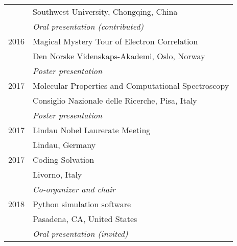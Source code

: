 \documentclass[notitlepage,a4paper,11pt]{article}
\begin{document}
\begin{itemize}
\begin{tabular}{ll}
         & Southwest University, Chongqing, China \\
         & \emph{Oral presentation (contributed)} \\
    2016 & Magical Mystery Tour of Electron Correlation \\
         & Den Norske Videnskaps-Akademi, Oslo, Norway \\
         & \emph{Poster presentation} \\
    2017 & Molecular Properties and Computational Spectroscopy \\
         & Consiglio Nazionale delle Ricerche, Pisa, Italy \\
         & \emph{Poster presentation} \\
    2017 & Lindau Nobel Laurerate Meeting \\
         & Lindau, Germany  \\
    2017 & Coding Solvation \\
         & Livorno, Italy \\
         & \emph{Co-organizer and chair} \\
    2018 & Python simulation software \\
         & Pasadena, CA, United States \\
         & \emph{Oral presentation (invited)} \\
  \end{tabular}
  
\end{itemize}

\pagebreak
\end{document}
